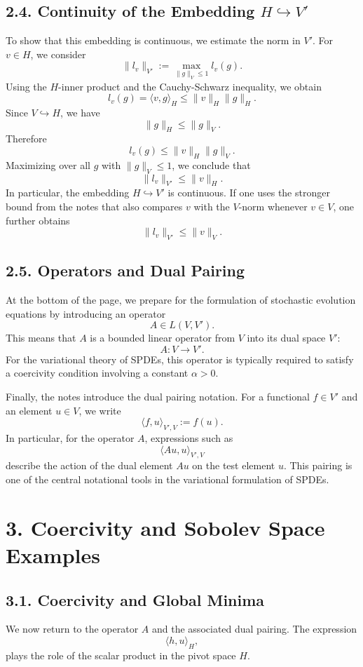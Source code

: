 \documentclass[11pt]{article}
\theoremstyle{definition}
\theoremstyle{remark}
\begin{document}
\subsection*{2.4. Continuity of the Embedding \(H\hookrightarrow V'\)}
To show that this embedding is continuous, we estimate the norm in \(V'\). For \(v\in H\), we consider
\[
\|l_v\|_{V'}
:=
\max_{\|g\|_V\le 1} l_v(g).
\]
Using the \(H\)-inner product and the Cauchy-Schwarz inequality, we obtain
\[
l_v(g)=\langle v,g\rangle_H\le \|v\|_H\|g\|_H.
\]
Since \(V\hookrightarrow H\), we have
\[
\|g\|_H\le \|g\|_V.
\]
Therefore
\[
l_v(g)\le \|v\|_H\|g\|_V.
\]
Maximizing over all \(g\) with \(\|g\|_V\le 1\), we conclude that
\[
\|l_v\|_{V'}\le \|v\|_H.
\]
In particular, the embedding \(H\hookrightarrow V'\) is continuous. If one uses the stronger bound from the notes that also compares \(v\) with the \(V\)-norm whenever \(v\in V\), one further obtains
\[
\|l_v\|_{V'}\le \|v\|_V.
\]

\subsection*{2.5. Operators and Dual Pairing}
At the bottom of the page, we prepare for the formulation of stochastic evolution equations by introducing an operator
\[
A\in L(V,V').
\]
This means that \(A\) is a bounded linear operator from \(V\) into its dual space \(V'\):
\[
A:V\to V'.
\]
For the variational theory of SPDEs, this operator is typically required to satisfy a coercivity condition involving a constant \(\alpha>0\).

Finally, the notes introduce the dual pairing notation. For a functional \(f\in V'\) and an element \(u\in V\), we write
\[
\langle f,u\rangle_{V',V}:=f(u).
\]
In particular, for the operator \(A\), expressions such as
\[
\langle Au,u\rangle_{V',V}
\]
describe the action of the dual element \(Au\) on the test element \(u\). This pairing is one of the central notational tools in the variational formulation of SPDEs.

\section*{3. Coercivity and Sobolev Space Examples}

\subsection*{3.1. Coercivity and Global Minima}
We now return to the operator \(A\) and the associated dual pairing. The expression
\[
\langle h,u\rangle_H,
\]
plays the role of the scalar product in the pivot space \(H\).
\end{document}
